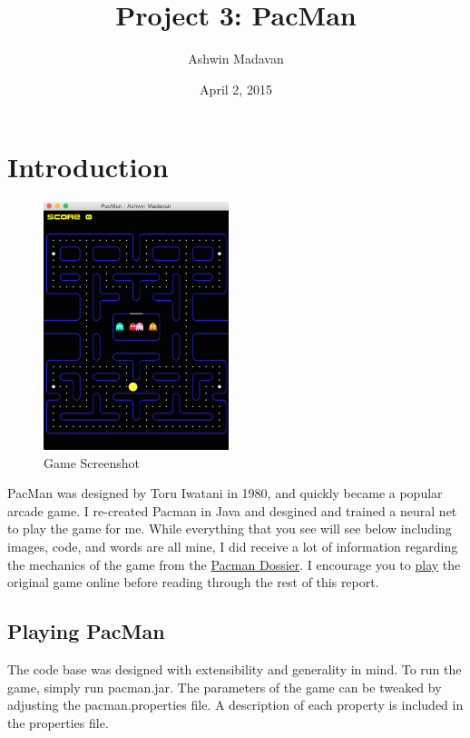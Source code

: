 \documentclass{article}
\begin{document}
\title{Project 3: PacMan}
\date{April 2, 2015}
\author{Ashwin Madavan}
\maketitle

\section{Introduction}
\begin{figure}
	\includegraphics[width=0.48\textwidth]{game}
	\caption{Game Screenshot \label{f:screenshot}}
\end{figure}

PacMan was designed by Toru Iwatani in 1980, and quickly became a popular arcade
game. I re-created Pacman in Java and desgined and trained a neural net to play
the game for me. While everything that you see will see below including images,
code, and words are all mine, I did receive a lot of information regarding the
mechanics of the game from the
\href{http://home.comcast.net/~jpittman2/pacman/pacmandossier.html}{Pacman
Dossier}. I encourage you to \href{http://www.playpacmanonline.net/}{play} the
original game online before reading through the rest of this report.

\subsection{Playing PacMan}
The code base was designed with extensibility and generality in mind. To run the
game, simply run pacman.jar. The parameters of the game can be tweaked by
adjusting the pacman.properties file. A description of each property is included
in the properties file.
\end{document}

